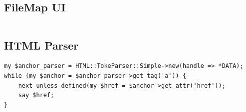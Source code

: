 \documentclass[letterpaper,10pt,titlepage,draftclsnofoot,onecolumn,onesided] {IEEEtran}
\begin{document}
	\subsection{FileMap UI}
	\begin{lstlisting}

	\end{lstlisting}

	\subsection{HTML Parser}
	\begin{lstlisting}
my $anchor_parser = HTML::TokeParser::Simple->new(handle => *DATA);
while (my $anchor = $anchor_parser->get_tag('a')) {
    next unless defined(my $href = $anchor->get_attr('href'));
    say $href;
}
	\end{lstlisting}
	
\pagebreak
\end{document}
